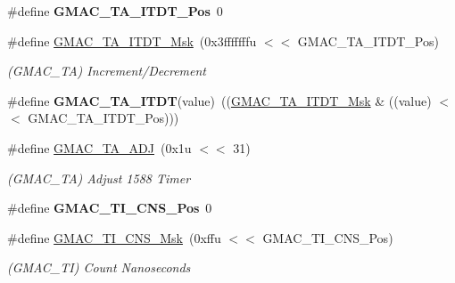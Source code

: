 \begin{DoxyCompactItemize}
\item 
\mbox{\label{group__SAME70__GMAC_ga2a7c36dc7254569a1b07fe0d3e32f8f6}} 
\#define {\bfseries G\+M\+A\+C\+\_\+\+T\+A\+\_\+\+I\+T\+D\+T\+\_\+\+Pos}~0
\item 
\mbox{\label{group__SAME70__GMAC_ga34c6aad04528e21f7361d585fa8c8de5}} 
\#define \mbox{\hyperlink{group__SAME70__GMAC_ga34c6aad04528e21f7361d585fa8c8de5}{G\+M\+A\+C\+\_\+\+T\+A\+\_\+\+I\+T\+D\+T\+\_\+\+Msk}}~(0x3fffffffu $<$$<$ G\+M\+A\+C\+\_\+\+T\+A\+\_\+\+I\+T\+D\+T\+\_\+\+Pos)
\begin{DoxyCompactList}\small\item\em (G\+M\+A\+C\+\_\+\+TA) Increment/\+Decrement \end{DoxyCompactList}\item 
\mbox{\label{group__SAME70__GMAC_ga46443263ed62ca3087321673cd415f6b}} 
\#define {\bfseries G\+M\+A\+C\+\_\+\+T\+A\+\_\+\+I\+T\+DT}(value)~((\mbox{\hyperlink{group__SAMV71__GMAC_ga34c6aad04528e21f7361d585fa8c8de5}{G\+M\+A\+C\+\_\+\+T\+A\+\_\+\+I\+T\+D\+T\+\_\+\+Msk}} \& ((value) $<$$<$ G\+M\+A\+C\+\_\+\+T\+A\+\_\+\+I\+T\+D\+T\+\_\+\+Pos)))
\item 
\mbox{\label{group__SAME70__GMAC_ga71b891fe014c77e534b084b3afa16ffd}} 
\#define \mbox{\hyperlink{group__SAME70__GMAC_ga71b891fe014c77e534b084b3afa16ffd}{G\+M\+A\+C\+\_\+\+T\+A\+\_\+\+A\+DJ}}~(0x1u $<$$<$ 31)
\begin{DoxyCompactList}\small\item\em (G\+M\+A\+C\+\_\+\+TA) Adjust 1588 Timer \end{DoxyCompactList}\item 
\mbox{\label{group__SAME70__GMAC_ga393ab99bd711ecff1337a6356b71103a}} 
\#define {\bfseries G\+M\+A\+C\+\_\+\+T\+I\+\_\+\+C\+N\+S\+\_\+\+Pos}~0
\item 
\mbox{\label{group__SAME70__GMAC_gade1be71165e92b0b8d5e29e773099cb7}} 
\#define \mbox{\hyperlink{group__SAME70__GMAC_gade1be71165e92b0b8d5e29e773099cb7}{G\+M\+A\+C\+\_\+\+T\+I\+\_\+\+C\+N\+S\+\_\+\+Msk}}~(0xffu $<$$<$ G\+M\+A\+C\+\_\+\+T\+I\+\_\+\+C\+N\+S\+\_\+\+Pos)
\begin{DoxyCompactList}\small\item\em (G\+M\+A\+C\+\_\+\+TI) Count Nanoseconds \end{DoxyCompactList}\item 

\end{DoxyCompactItemize}
